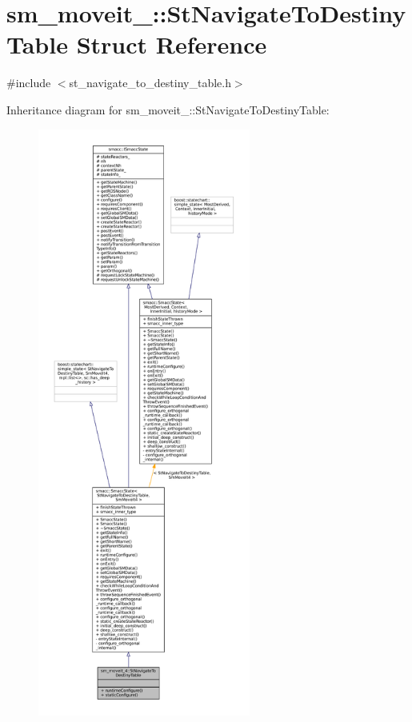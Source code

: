 \hypertarget{structsm__moveit__4_1_1StNavigateToDestinyTable}{}\section{sm\+\_\+moveit\+\_\+:\+:St\+Navigate\+To\+Destiny\+Table Struct Reference}
\label{structsm__moveit__4_1_1StNavigateToDestinyTable}


{\ttfamily \#include $<$st\+\_\+navigate\+\_\+to\+\_\+destiny\+\_\+table.\+h$>$}



Inheritance diagram for sm\+\_\+moveit\+\_\+:\+:St\+Navigate\+To\+Destiny\+Table\+:
\nopagebreak
\begin{figure}[H]
\begin{center}
\leavevmode
\includegraphics[height=550pt]{structsm__moveit__4_1_1StNavigateToDestinyTable__inherit__graph}
\end{center}
\end{figure}


